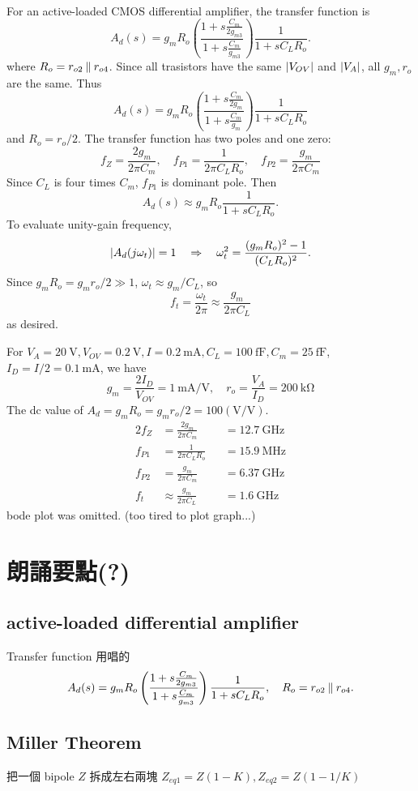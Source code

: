 \documentclass[12pt, a4paper]{article}
\begin{document}
\Ans \\
For an active-loaded CMOS differential amplifier, the transfer function is
\[
  A_d(s) = g_mR_o\left(\frac{1+s\frac{C_m}{2g_{m3}}}{1+s\frac{C_m}{g_{m3}}}\right)
      \frac{1}{1+sC_LR_o}.
\]
where $R_o = r_{o2} \mathbin{\|} r_{o4}$.
Since all trasistors have the same $\lvert V_{OV}\rvert$ and $\lvert V_A\rvert$, all
$g_m, r_o$ are the same. Thus
\[
  A_d(s) = g_mR_o\left(\frac{1+s\frac{C_m}{2g_m}}{1+s\frac{C_m}{g_m}}\right)
      \frac{1}{1+sC_LR_o}
\]
and $R_o = r_o / 2$. The transfer function has two poles and one zero:
\[
  f_Z = \frac{2g_m}{2\pi C_m}, \quad
  f_{P1} = \frac{1}{2\pi C_LR_o}, \quad
  f_{P2} = \frac{g_m}{2\pi C_m}
\]
Since $C_L$ is four times $C_m$, $f_{P1}$ is dominant pole. Then
\[
  A_d(s) \approx g_mR_o \frac{1}{1+sC_LR_o}.
\]
To evaluate unity-gain frequency,
\[
  \lvert A_d(j\omega_t)\rvert = 1 \quad \Rightarrow \quad
  \omega_t^2 = \frac{(g_mR_o)^2 - 1}{(C_LR_o)^2}.
\]
Since $g_mR_o = g_mr_o/2 \gg 1$, $\omega_t \approx g_m/C_L$, so
\[
  f_t = \frac{\omega_t}{2\pi} \approx \frac{g_m}{2\pi C_L}
\]
as desired.

For $V_A=\SI{20}{\V}, V_{OV}=\SI{0.2}{\V}, I=\SI{0.2}{\mA},
C_L=\SI{100}{\fF},C_m=\SI{25}{\fF}$, $I_D = I/2=\SI{0.1}{\mA}$, we have
\[
  g_m = \frac{2I_D}{V_{OV}} = \SI{1}{\mA/\V}, \quad
  r_o = \frac{V_A}{I_D} = \SI{200}{\kohm}
\]
The dc value of $A_d = g_mR_o = g_mr_o/2 = 100(\si{\V/\V})$.
\begin{alignat*}{2}
  f_Z &= \frac{2g_m}{2\pi C_m} & &= \SI{12.7}{\GHz} \\
  f_{P1} &= \frac{1}{2\pi C_LR_o} & &= \SI{15.9}{\MHz} \\
  f_{P2} &= \frac{g_m}{2\pi C_m} & &= \SI{6.37}{\GHz} \\
  f_t &\approx \frac{g_m}{2\pi C_L} & &= \SI{1.6}{\GHz}
\end{alignat*}
bode plot was omitted. (too tired to plot graph...)

\section{朗誦要點(?)}
\subsection{active-loaded differential amplifier}
Transfer function 用唱的
\[
  A_d(s) = g_mR_o\left(\frac{1+s\frac{C_m}{2g_{m3}}}{1+s\frac{C_m}{g_{m3}}}\right)
  \frac{1}{1+sC_LR_o}, \quad R_o = r_{o2} \mathbin{\|} r_{o4}.
\]
\subsection{Miller Theorem}
把一個 bipole $Z$ 拆成左右兩塊
$Z_{eq1} = Z (1-K), Z_{eq2} = Z (1 - 1/K)$
\end{document}
